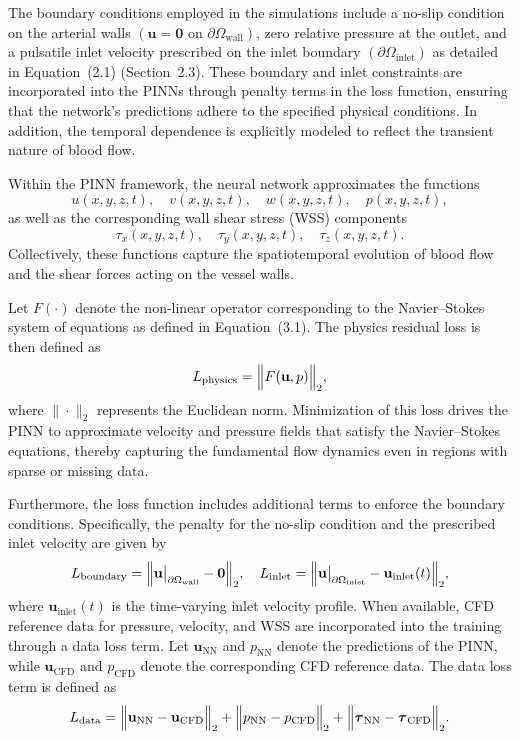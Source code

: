 \documentclass[12pt, a4paper]{article}
\begin{document}
The boundary conditions employed in the simulations include a no-slip condition on the arterial walls \((\mathbf{u} = \mathbf{0} \text{ on } \partial\Omega_{\mathrm{wall}})\), zero relative pressure at the outlet, and a pulsatile inlet velocity prescribed on the inlet boundary \((\partial\Omega_{\mathrm{inlet}})\) as detailed in Equation~(2.1) (Section~2.3). These boundary and inlet constraints are incorporated into the PINNs through penalty terms in the loss function, ensuring that the network’s predictions adhere to the specified physical conditions. In addition, the temporal dependence is explicitly modeled to reflect the transient nature of blood flow.

Within the PINN framework, the neural network approximates the functions
\[
u(x,y,z,t),\quad v(x,y,z,t),\quad w(x,y,z,t),\quad p(x,y,z,t),
\]
as well as the corresponding wall shear stress (WSS) components
\[
\tau_x(x,y,z,t),\quad \tau_y(x,y,z,t),\quad \tau_z(x,y,z,t).
\]
Collectively, these functions capture the spatiotemporal evolution of blood flow and the shear forces acting on the vessel walls.

Let \(F(\cdot)\) denote the non-linear operator corresponding to the Navier–Stokes system of equations as defined in Equation~(3.1). The physics residual loss is then defined as
\begin{equation}
L_{\mathrm{physics}} = \Bigl\|F(\mathbf{u}, p)\Bigr\|_2,
\end{equation}
where \(\|\cdot\|_2\) represents the Euclidean norm. Minimization of this loss drives the PINN to approximate velocity and pressure fields that satisfy the Navier–Stokes equations, thereby capturing the fundamental flow dynamics even in regions with sparse or missing data.

Furthermore, the loss function includes additional terms to enforce the boundary conditions. Specifically, the penalty for the no-slip condition and the prescribed inlet velocity are given by
\begin{equation}
L_{\mathrm{boundary}} = \Bigl\|\mathbf{u}\big|_{\partial\Omega_{\mathrm{wall}}} - \mathbf{0}\Bigr\|_2,\quad
L_{\mathrm{inlet}} = \Bigl\|\mathbf{u}\big|_{\partial\Omega_{\mathrm{inlet}}} - \mathbf{u}_{\mathrm{inlet}}(t)\Bigr\|_2,
\end{equation}
where \(\mathbf{u}_{\mathrm{inlet}}(t)\) is the time-varying inlet velocity profile. When available, CFD reference data for pressure, velocity, and WSS are incorporated into the training through a data loss term. Let \(\mathbf{u}_{\mathrm{NN}}\) and \(p_{\mathrm{NN}}\) denote the predictions of the PINN, while \(\mathbf{u}_{\mathrm{CFD}}\) and \(p_{\mathrm{CFD}}\) denote the corresponding CFD reference data. The data loss term is defined as
\begin{equation}
L_{\mathrm{data}} = \Bigl\|\mathbf{u}_{\mathrm{NN}} - \mathbf{u}_{\mathrm{CFD}}\Bigr\|_2 + \Bigl\|p_{\mathrm{NN}} - p_{\mathrm{CFD}}\Bigr\|_2 + \Bigl\|\boldsymbol{\tau}_{\mathrm{NN}} - \boldsymbol{\tau}_{\mathrm{CFD}}\Bigr\|_2.
\end{equation}
\end{document}
